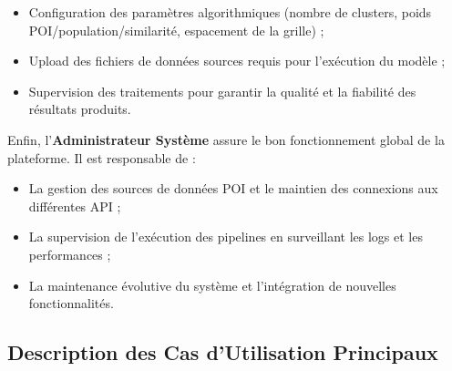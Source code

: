 \documentclass[11pt,a4paper,twoside]{report}
\begin{document}
\begin{itemize}[leftmargin=1.2cm]
    \item Configuration des paramètres algorithmiques (nombre de clusters, poids POI/population/similarité, espacement de la grille) ;
    \item Upload des fichiers de données sources requis pour l'exécution du modèle ;
    \item Supervision des traitements pour garantir la qualité et la fiabilité des résultats produits.
\end{itemize}

Enfin, l'\textbf{Administrateur Système} assure le bon fonctionnement global de la plateforme. Il est responsable de :

\begin{itemize}[leftmargin=1.2cm]
    \item La gestion des sources de données POI et le maintien des connexions aux différentes API ;
    \item La supervision de l'exécution des pipelines en surveillant les logs et les performances ;
    \item La maintenance évolutive du système et l'intégration de nouvelles fonctionnalités.
\end{itemize}

\subsection{Description des Cas d'Utilisation Principaux}
\end{document}
